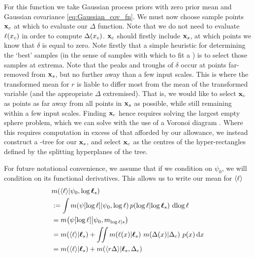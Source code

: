 \documentclass{article}
\begin{document}
For this function we take Gaussian process priors with zero prior mean and Gaussian covariance \eqref{eq:Gaussian_cov_fn}. We must now choose sample points $\vlfv_c$ at which to evaluate our $\Delta$ function. 
Note that we do not need to evaluate $\lfn(\lfv_c)$ in order to compute $\Delta(\lfv_c)$.
$\vlfv_c$ should firstly include $\vlfv_s$, at which points we know that $\delta$ is equal to zero. Note firstly that a simple heuristic for determining the `best' samples (in the sense of samples with which to fit a \gp) is to select those samples at extrema. Note that the peaks and troughs of $\delta$ occur at points far-removed from $\vlfv_s$, but no further away than a few input scales. This is where the transformed mean for $r$ is liable to differ most from the mean of the transformed variable (and the appropriate $\Delta$ extremised). That is, we would like to select $\vlfv_c$ as points as far away from all points in $\vlfv_s$ as possible, while still remaining within a few input scales. 
Finding $\vlfv_c$ hence requires solving the largest empty sphere problem, which we can solve with the use of a Voronoi diagram \citep{Voronoi, shamos1975closest, okabe1997locational}. 
Where this requires computation in excess of that afforded by our allowance, we instead construct a -tree \citep{bentley1975multidimensional} for our $\vlfv_s$, and select $\vlfv_c$ as the centres of the hyper-rectangles defined by the splitting
hyperplanes of the tree.

For future notational convenience, we assume that if we condition on $\psi_0$, we will condition on its functional derivatives. This allows us to write our mean for  $\inty{\lfn}$
%
\begin{align}
& \mean{\inty{\lfn}}{\psi_0,\tvr_s} \nonumber\\
& \deq \int \mean{\psi[\tr]}{\psi_0,\tr}
\p{\tr}{\tvr_s}\, \ud \tr 
\nonumber\\
& = \mean{\psi[\tr]}{\psi_0,m_{\tr|s}} \nonumber\\
& = \mean{\inty{\lfn}}{\vr_s} + \iint \mean{\lfn(\lfv)}{\vr_s}\,
\mean{\Delta(\lfv)}{\Delta_c}\,\po{\lfv}\ud\lfv
\nonumber\\
& = \mean{\inty{\lfn}}{\vr_s} + \mean{\inty{r \Delta}}{\vr_s, \Delta_c}
\label{eq:mean_ev}
\end{align}
\end{document}
